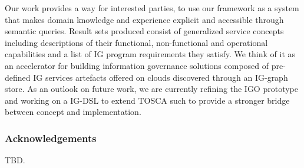 \documentclass[runningheads]{llncs}
\begin{document}
Our work provides a way for interested parties, to use our framework as a system that makes domain knowledge and experience explicit and accessible through semantic queries. Result sets produced consist of generalized service concepts including descriptions of their functional, non-functional and operational capabilities and a list of IG program requirements they satisfy. We think of it as an accelerator for building information governance solutions composed of pre-defined IG services artefacts offered on clouds discovered through an IG-graph store.
As an outlook on future work, we are currently refining the IGO prototype and working on a IG-DSL to extend TOSCA such to provide a stronger bridge between concept and implementation.  

\subsubsection{Acknowledgements} TBD.
%
%
%
% 
% 
%
\end{document}
